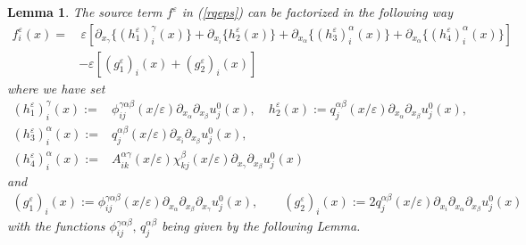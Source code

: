 \documentclass[11pt, reqno]{amsart}
\newtheorem{lemma}[theorem]{Lemma}
\theoremstyle{definition}
\theoremstyle{remark}
\numberwithin{equation}{section}
\begin{document}
	
	\begin{lemma}\label{fepsordereps} The source term $ f^\varepsilon$ in \textup{(\ref{rqeps})} can be factorized in the following way
		\begin{align}
			f_i^\varepsilon(x)
			=& \,\varepsilon \left[ \partial_{x_\gamma} \{ 	(h^\varepsilon_1)_i^\gamma (x) \}	+ \partial_{x_i} \{ 	h^\varepsilon_2(x) \}
			+  \partial_{x_\alpha} \{ 	(h^\varepsilon_3)^\alpha_i(x) \}+ \partial_{x_\alpha}\{	(h_4^\varepsilon)_i^\alpha(x) \} \right] \nonumber \\
			&-\varepsilon \left[ 	(g^\varepsilon_1)_i(x)+	(g^\varepsilon_2)_i(x) \right] \label{Lemm_feps}
		\end{align}
		where we have set
		\begin{align}
			(h^\varepsilon_1)_i^\gamma (x)	:=& \phi^{\gamma\alpha\beta}_{ij}(x/\varepsilon)\partial_{x_\alpha}\partial_{x_\beta} u_j^0 (x), \quad
			h^\varepsilon_2(x):= q^{\alpha\beta}_{j}(x/\varepsilon)\partial_{x_\alpha}\partial_{x_\beta} u_j^0(x), \nonumber\\
			(h^\varepsilon_3)^\alpha_i(x):=&q^{\alpha\beta}_{j}(x/\varepsilon)\partial_{x_i}\partial_{x_\beta} u_j^0(x),
			\label{def_h_i_eps}\\
			(h_4^\varepsilon)_i^\alpha(x):= & A^{\alpha\gamma}_{ik} (x/\varepsilon) \chi^{\beta}_{kj}(x/\varepsilon)\partial_{x_\gamma}	\partial_{ x_{\beta}}  u_j^0 (x)\nonumber
		\end{align}
	and
		\begin{align}
			(g^\varepsilon_1)_i(x):=\phi^{\gamma\alpha\beta}_{ij}(x/\varepsilon)\partial_{x_\alpha}\partial_{x_\beta} \partial_{x_\gamma} u_j^0(x), \qquad 
			(g^\varepsilon_2)_i(x) := 2 q^{\alpha\beta}_{j}(x/\varepsilon)\partial_{x_i} \partial_{x_\alpha}\partial_{x_\beta} u_j^0(x)\label{def_geps}
		\end{align}
	 with the functions $ \phi^{\gamma\alpha\beta}_{ij}, \, q^{\alpha\beta}_{j}$  being given by the following Lemma. 
	\end{lemma}
	
\end{document}
